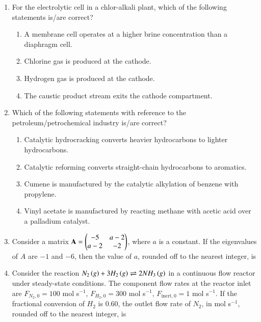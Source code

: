 \documentclass[journal,12pt,onecolumn]{IEEEtran}
\theoremstyle{remark}
\begin{document}
\begin{enumerate}
		\item For the electrolytic cell in a chlor-alkali plant, which of the following statements is/are correct?
		
		\hfill{}
		\begin{enumerate}
			\item A membrane cell operates at a higher brine concentration than a diaphragm cell.
			\item Chlorine gas is produced at the cathode.
			\item Hydrogen gas is produced at the cathode.
			\item The caustic product stream exits the cathode compartment.
		\end{enumerate}
		
		\item Which of the following statements with reference to the petroleum/petrochemical industry is/are correct?
		
		\hfill{}
		\begin{enumerate}
			\item Catalytic hydrocracking converts heavier hydrocarbons to lighter hydrocarbons.
			\item Catalytic reforming converts straight-chain hydrocarbons to aromatics.
			\item Cumene is manufactured by the catalytic alkylation of benzene with propylene.
			\item Vinyl acetate is manufactured by reacting methane with acetic acid over a palladium catalyst.
		\end{enumerate}
		
		\item Consider a matrix $\mathbf{A} = \begin{pmatrix}-5 & a-2 \\ a-2 & -2\end{pmatrix}$, where $a$ is a constant. If the eigenvalues of $A$ are $-1$ and $-6$, then the value of $a$, rounded off to the nearest integer, is \underline{\hspace{2cm}}
		
		\hfill{}
		
		\item Consider the reaction $N_2\left(g\right) + 3H_2\left(g\right) \rightleftharpoons 2NH_3\left(g\right)$ in a continuous flow reactor under steady-state conditions. The component flow rates at the reactor inlet are $F_{N_2,0} = 100$ mol s$^{-1}$, $F_{H_2,0} = 300$ mol s$^{-1}$, $F_{\text{inert},0} = 1$ mol s$^{-1}$. If the fractional conversion of $H_2$ is $0.60$, the outlet flow rate of $N_2$, in mol s$^{-1}$, rounded off to the nearest integer, is \underline{\hspace{2cm}}
		

\end{enumerate}
\end{document}

